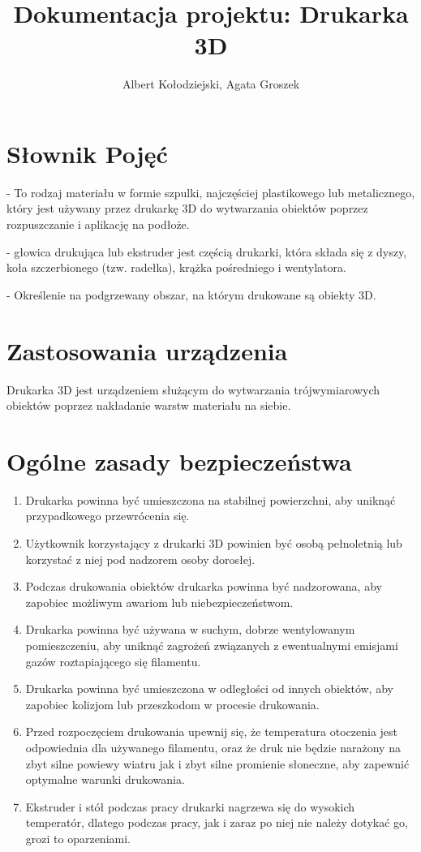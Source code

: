 \documentclass{article}
\title{Dokumentacja projektu: Drukarka 3D}
\author{Albert Kołodziejski, Agata Groszek}
\begin{document}
\date{}
\maketitle

\tableofcontents

\section{Słownik Pojęć}
\begin{description}[align=left]
    \item[Filament] - To rodzaj materiału w formie szpulki, najczęściej plastikowego lub metalicznego, który jest używany przez drukarkę 3D do wytwarzania obiektów poprzez rozpuszczanie i aplikację na podłoże.
    \item[Ekstruder] - głowica drukująca lub ekstruder jest częścią drukarki, która składa się z dyszy, koła szczerbionego (tzw. radełka), krążka pośredniego i wentylatora.
    \item[Stół] - Określenie na podgrzewany obszar, na którym drukowane są obiekty 3D.
\end{description}

\section{Zastosowania urządzenia}
Drukarka 3D jest urządzeniem służącym do wytwarzania trójwymiarowych obiektów poprzez nakładanie warstw materiału na siebie. 


\newpage
\section{Ogólne zasady bezpieczeństwa}
\begin{enumerate}[label=\arabic*.]
    \item Drukarka powinna być umieszczona na stabilnej powierzchni, aby uniknąć przypadkowego przewrócenia się.
    \item Użytkownik korzystający z drukarki 3D powinien być osobą pełnoletnią lub korzystać z niej pod nadzorem osoby dorosłej.
    \item Podczas drukowania obiektów drukarka powinna być nadzorowana, aby zapobiec możliwym awariom lub niebezpieczeństwom.
    \item  Drukarka powinna być używana w suchym, dobrze wentylowanym pomieszczeniu, aby uniknąć zagrożeń związanych z ewentualnymi emisjami gazów roztapiającego się filamentu.
    \item Drukarka powinna być umieszczona w odległości od innych obiektów, aby zapobiec kolizjom lub przeszkodom w procesie drukowania.
    \item  Przed rozpoczęciem drukowania upewnij się, że temperatura otoczenia jest odpowiednia dla używanego filamentu, oraz że druk nie będzie narażony na zbyt silne powiewy wiatru jak i zbyt silne promienie słoneczne, aby zapewnić optymalne warunki drukowania.
    \item Ekstruder i stół podczas pracy drukarki nagrzewa się do wysokich temperatór, dlatego podczas pracy, jak i zaraz po niej nie należy dotykać go, grozi to oparzeniami.
\end{enumerate}
\end{document}

